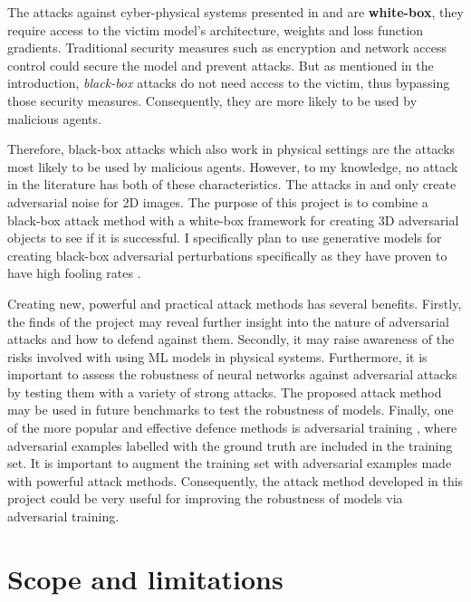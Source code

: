 The attacks against cyber-physical systems presented in \cite{athalye} and \cite{evtimov_road_signs} are \textbf{white-box}, they require access to the victim model's architecture, weights and loss function gradients. Traditional security measures such as encryption and network access control could secure the model and prevent attacks. But as mentioned in the introduction, \textit{black-box} attacks do not need access to the victim, thus bypassing those security measures. Consequently, they are more likely to be used by malicious agents. 

Therefore, black-box attacks which also work in physical settings are the attacks most likely to be used by malicious agents. However, to my knowledge, no attack in the literature has both of these characteristics. The attacks in \cite{upset_angri} and \cite{zheng_black_box_GAN} only create adversarial noise for 2D images. The purpose of this project is to combine a black-box attack method with a white-box framework for creating 3D adversarial objects to see if it is successful. I specifically plan to use generative models for creating black-box adversarial perturbations specifically as they have proven to have high fooling rates \cite{upset_angri, zheng_black_box_GAN}.

Creating new, powerful and practical attack methods has several benefits. Firstly, the finds of the project may reveal further insight into the nature of adversarial attacks and how to defend against them. Secondly, it may raise awareness of the risks involved with using ML models in physical systems. Furthermore, it is important to assess the robustness of neural networks against adversarial attacks by testing them with a variety of strong attacks. The proposed attack method may be used in future benchmarks to test the robustness of models. Finally, one of the more popular and effective defence methods is adversarial training \cite{dong2020benchmarking}, where adversarial examples labelled with the ground truth are included in the training set. It is important to augment the training set with adversarial examples made with powerful attack methods. Consequently, the attack method developed in this project could be very useful for improving the robustness of models via adversarial training.

\section{Scope and limitations}
    \label{sec:scope_limitations}
    
